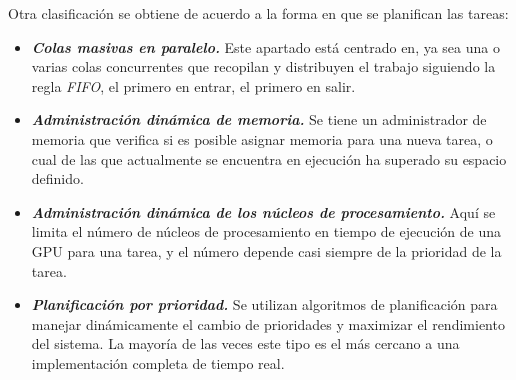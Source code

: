 \begin{itemize}



\end{itemize}
	
Otra clasificación se obtiene de acuerdo a la forma en que se planifican las tareas:

\begin{itemize}

\item \textbf{\textit{Colas masivas en paralelo.}}
	Este apartado está centrado en, ya sea una o varias colas concurrentes que recopilan y distribuyen el trabajo siguiendo la regla \textit{FIFO}, el primero en entrar, el primero en salir. 
	
\item \textbf{\textit{Administración dinámica de memoria.}}
	Se tiene un administrador de memoria que verifica si es posible asignar memoria para una nueva tarea, o cual de las que actualmente se encuentra en ejecución ha superado su espacio definido. 
	
\item \textbf{\textit{Administración dinámica de los núcleos de procesamiento.}}
	Aquí se limita el número de núcleos de procesamiento en tiempo de ejecución de una GPU para una tarea, y el número depende casi siempre de la prioridad de la tarea.

	
\item \textbf{\textit{Planificación por prioridad.}}
	Se utilizan algoritmos de planificación para manejar dinámicamente el cambio de prioridades y maximizar el rendimiento del sistema. La mayoría de las veces este tipo es el más cercano a una implementación completa de tiempo real.
	
\end{itemize}

